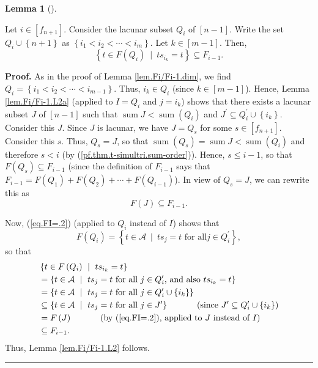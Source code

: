 \documentclass[numbers=enddot,12pt,final,onecolumn,notitlepage]{scrartcl}%
\theoremstyle{definition}
\newtheorem{lem}[theo]{Lemma}
\newenvironment{lemma}[1][]
{\begin{lem}[#1]\begin{leftbar}}
{\end{leftbar}\end{lem}}
\newenvironment{proof}[1][Proof]{\noindent\textbf{#1.} }{\ \rule{0.5em}{0.5em}}
\begin{document}
\begin{lemma}
\label{lem.Fi/Fi-1.L2}Let $i\in\left[  f_{n+1}\right]  $. Consider the lacunar
subset $Q_{i}$ of $\left[  n-1\right]  $. Write the set $Q_{i}\cup\left\{
n+1\right\}  $ as $\left\{  i_{1}<i_{2}<\cdots<i_{m}\right\}  $. Let
$k\in\left[  m-1\right]  $. Then,%
\[
\left\{  t\in F\left(  Q_{i}\right)  \ \mid\ ts_{i_{k}}=t\right\}  \subseteq
F_{i-1}.
\]

\end{lemma}

\begin{proof}
As in the proof of Lemma \ref{lem.Fi/Fi-1.dim}, we find $Q_{i}=\left\{
i_{1}<i_{2}<\cdots<i_{m-1}\right\}  $. Thus, $i_{k}\in Q_{i}$ (since
$k\in\left[  m-1\right]  $). Hence, Lemma \ref{lem.Fi/Fi-1.L2a} (applied to
$I=Q_{i}$ and $j=i_{k}$) shows that there exists a lacunar subset $J$ of
$\left[  n-1\right]  $ such that $\operatorname*{sum}J<\operatorname*{sum}%
\left(  Q_{i}\right)  $ and $J^{\prime}\subseteq Q_{i}^{\prime}\cup\left\{
i_{k}\right\}  $. Consider this $J$. Since $J$ is lacunar, we have $J=Q_{s}$
for some $s\in\left[  f_{n+1}\right]  $. Consider this $s$. Thus, $Q_{s}=J$,
so that $\operatorname*{sum}\left(  Q_{s}\right)  =\operatorname*{sum}%
J<\operatorname*{sum}\left(  Q_{i}\right)  $ and therefore $s<i$ (by
(\ref{pf.thm.t-simultri.sum-order})). Hence, $s\leq i-1$, so that $F\left(
Q_{s}\right)  \subseteq F_{i-1}$ (since the definition of $F_{i-1}$ says that
$F_{i-1}=F\left(  Q_{1}\right)  +F\left(  Q_{2}\right)  +\cdots+F\left(
Q_{i-1}\right)  $). In view of $Q_{s}=J$, we can rewrite this as%
\[
F\left(  J\right)  \subseteq F_{i-1}.
\]


Now, (\ref{eq.FI=.2}) (applied to $Q_{i}$ instead of $I$) shows that%
\[
F\left(  Q_{i}\right)  =\left\{  t\in\mathcal{A}\ \mid\ ts_{j}=t\text{ for all
}j\in Q_{i}^{\prime}\right\}  ,
\]
so that%
\begin{align*}
&  \left\{  t\in F\left(  Q_{i}\right)  \ \mid\ ts_{i_{k}}=t\right\} \\
&  =\left\{  t\in\mathcal{A}\ \mid\ ts_{j}=t\text{ for all }j\in Q_{i}%
^{\prime}\text{, and also }ts_{i_{k}}=t\right\} \\
&  =\left\{  t\in\mathcal{A}\ \mid\ ts_{j}=t\text{ for all }j\in Q_{i}%
^{\prime}\cup\left\{  i_{k}\right\}  \right\} \\
&  \subseteq\left\{  t\in\mathcal{A}\ \mid\ ts_{j}=t\text{ for all }j\in
J^{\prime}\right\}  \ \ \ \ \ \ \ \ \ \ \left(  \text{since }J^{\prime
}\subseteq Q_{i}^{\prime}\cup\left\{  i_{k}\right\}  \right) \\
&  =F\left(  J\right)  \ \ \ \ \ \ \ \ \ \ \left(  \text{by (\ref{eq.FI=.2}),
applied to }J\text{ instead of }I\right) \\
&  \subseteq F_{i-1}.
\end{align*}
Thus, Lemma \ref{lem.Fi/Fi-1.L2} follows.
\end{proof}
\end{document}
